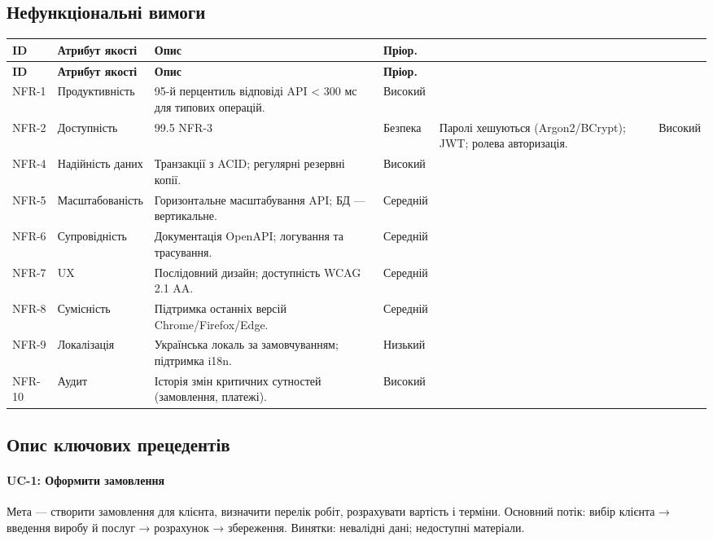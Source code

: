 \documentclass[14pt,a4paper]{extarticle}
\begin{document}
\subsection{Нефункціональні вимоги}
\begin{longtable}{@{}p{1.8cm} p{5.0cm} p{10.0cm} p{2.0cm}@{}}
\toprule
\textbf{ID} & \textbf{Атрибут якості} & \textbf{Опис} & \textbf{Пріор.}\\
\midrule
\endfirsthead
\toprule
\textbf{ID} & \textbf{Атрибут якості} & \textbf{Опис} & \textbf{Пріор.}\\
\midrule
\endhead
NFR-1 & Продуктивність & 95-й перцентиль відповіді API < 300 мс для типових операцій. & Високий \\
NFR-2 & Доступність & 99.5%
NFR-3 & Безпека & Паролі хешуються (Argon2/BCrypt); JWT; ролева авторизація. & Високий \\
NFR-4 & Надійність даних & Транзакції з ACID; регулярні резервні копії. & Високий \\
NFR-5 & Масштабованість & Горизонтальне масштабування API; БД — вертикальне. & Середній \\
NFR-6 & Супровідність & Документація OpenAPI; логування та трасування. & Середній \\
NFR-7 & UX & Послідовний дизайн; доступність WCAG 2.1 AA. & Середній \\
NFR-8 & Сумісність & Підтримка останніх версій Chrome/Firefox/Edge. & Середній \\
NFR-9 & Локалізація & Українська локаль за замовчуванням; підтримка i18n. & Низький \\
NFR-10 & Аудит & Історія змін критичних сутностей (замовлення, платежі). & Високий \\
\bottomrule
\end{longtable}

\subsection{Опис ключових прецедентів}
\paragraph{UC-1: Оформити замовлення} Мета — створити замовлення для клієнта, визначити перелік робіт, розрахувати вартість і терміни. Основний потік: вибір клієнта → введення виробу й послуг → розрахунок → збереження. Винятки: невалідні дані; недоступні матеріали.
\end{document}
